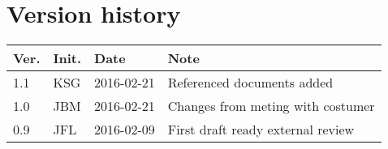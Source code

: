 \chapter*{Version history}
\label{app:rev_his}


\begin{tabular}{b{1cm} b{1cm} b{2cm} b{8cm}}
    \textbf{Ver.} & \textbf{Init.} & \textbf{Date} & \textbf{Note} \\
    \hline
    1.1 & KSG & 2016-02-21 & Referenced documents added \\
    1.0 & JBM & 2016-02-21 & Changes from meting with costumer \\
    0.9 & JFL & 2016-02-09 & First draft ready external review \\
\end{tabular}
